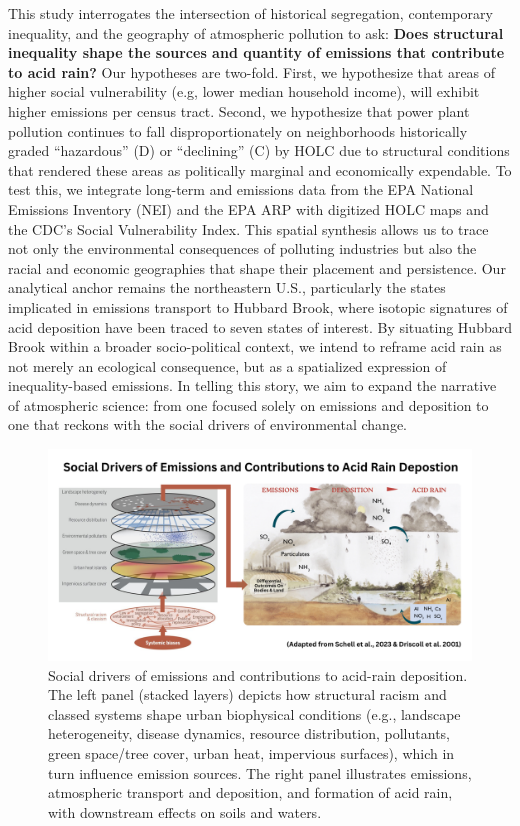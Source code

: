 \documentclass[
  english,
  jou]{apa6}
\begin{document}
This study interrogates the intersection of historical segregation, contemporary inequality, and the geography of atmospheric pollution to ask: \textbf{Does structural inequality shape the sources and quantity of emissions that contribute to acid rain?} Our hypotheses are two-fold. First, we hypothesize that areas of higher social vulnerability (e.g, lower median household income), will exhibit higher emissions per census tract. Second, we hypothesize that power plant pollution continues to fall disproportionately on neighborhoods historically graded ``hazardous'' (D) or ``declining'' (C) by HOLC due to structural conditions that rendered these areas as politically marginal and economically expendable. To test this, we integrate long-term  and  emissions data from the EPA National Emissions Inventory (NEI) and the EPA ARP with digitized HOLC maps and the CDC's Social Vulnerability Index. This spatial synthesis allows us to trace not only the environmental consequences of polluting industries but also the racial and economic geographies that shape their placement and persistence. Our analytical anchor remains the northeastern U.S., particularly the states implicated in emissions transport to Hubbard Brook, where isotopic signatures of acid deposition have been traced to seven states of interest. By situating Hubbard Brook within a broader socio-political context, we intend to reframe acid rain as not merely an ecological consequence, but as a spatialized expression of inequality-based emissions. In telling this story, we aim to expand the narrative of atmospheric science: from one focused solely on emissions and deposition to one that reckons with the social drivers of environmental change.

\begin{figure}[H]

{\centering \includegraphics[width=1\linewidth]{Figures/CEL_Visual_Abstract} 

}

\caption[Social drivers of emissions and acid-rain deposition.]{Social drivers of emissions and contributions to acid-rain deposition. The left panel (stacked layers) depicts how structural racism and classed systems shape urban biophysical conditions (e.g., landscape heterogeneity, disease dynamics, resource distribution, pollutants, green space/tree cover, urban heat, impervious surfaces), which in turn influence emission sources. The right panel illustrates emissions, atmospheric transport and deposition, and formation of acid rain, with downstream effects on soils and waters.}\label{fig:visual-abstract}
\end{figure}
\end{document}
